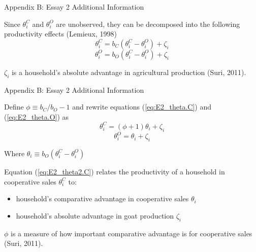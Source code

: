 \documentclass[aspectratio=169]{beamer}
\newenvironment{wideitemize}{\itemize\addtolength{\itemsep}{10pt}}{\enditemize}
\begin{document}
\begin{frame}{Appendix B: Essay 2 Additional Information}
    \begin{wideitemize}
        \item Since $\theta^{C}_{i}$ and $\theta^{O}_{i}$ are unobserved, they can be decomposed into the following productivity effects (Lemieux, 1998) \vspace{.5cm}
    \end{wideitemize}
    \begin{equation} \label{eq:E2_theta.C}
        \theta^{C}_{i} = b_{C}(\theta^{C}_{i} - \theta^{O}_{i}) + \zeta_{i}
    \end{equation}
    \begin{equation} \label{eq:E2_theta.O}
        \theta^{O}_{i} = b_{O}(\theta^{C}_{i} - \theta^{O}_{i}) + \zeta_{i}
    \end{equation}
    \begin{wideitemize}
        \item $\zeta_{i}$ is a household’s absolute advantage in agricultural production (Suri, 2011). 
    \end{wideitemize}
\end{frame}

\begin{frame}{Appendix B: Essay 2 Additional Information}
    \begin{wideitemize}
        \item Define $\phi \equiv b_C / b_O - 1$ and rewrite equations (\ref{eq:E2_theta.C}) and (\ref{eq:E2_theta.O}) as \vspace{.5cm}
    \end{wideitemize}
    \begin{equation} \label{eq:E2_theta2.C}
        \theta^{C}_{i} = (\phi + 1)\theta_{i} + \zeta_i
    \end{equation}
    \begin{equation} \label{eq:E2_theta2.O}
        \theta^{O}_{i} = \theta_{i} + \zeta_i
    \end{equation}
    \begin{wideitemize}
        \item Where $\theta_{i} \equiv b_{O}(\theta^{C}_{i} - \theta^{O}_{i})$
        \item Equation (\ref{eq:E2_theta2.C}) relates the productivity of a household in cooperative sales $\theta^{C}_{i}$ to:
        \begin{itemize}
            \item household’s comparative advantage in cooperative sales $\theta_{i}$
            \item household’s absolute advantage in goat production $\zeta_i$
        \end{itemize} 
        \item $\phi$ is a measure of how important comparative advantage is for cooperative sales (Suri, 2011).
    \end{wideitemize}
\end{frame}
\end{document}
